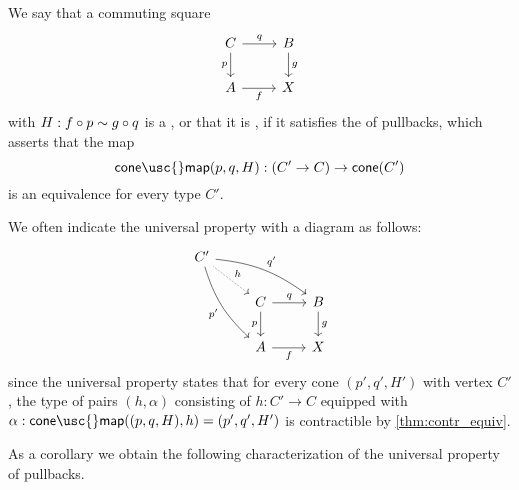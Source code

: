 \begin{defn}
We say that a commuting square
\begin{equation*}
\begin{tikzcd}
C \arrow[r,"q"] \arrow[d,swap,"p"] & B \arrow[d,"g"] \\
A \arrow[r,swap,"f"] & X
\end{tikzcd}
\end{equation*}
with $H:f\circ p\sim g\circ q$ is a , or that it is , if it satisfies the  of pullbacks, which asserts that the map
\begin{equation*}
\mathsf{cone\usc{}map}(p,q,H):(C'\to C)\to\mathsf{cone}(C')
\end{equation*}
is an equivalence for every type $C'$. 
\end{defn}

We often indicate the universal property with a diagram as follows:
\begin{equation*}
\begin{tikzcd}
C' \arrow[drr,bend left=15,"{q'}"] \arrow[dr,densely dotted,"h"] \arrow[ddr,bend right=15,swap,"{p'}"] \\
& C \arrow[r,"q"] \arrow[d,swap,"p"] & B \arrow[d,"g"] \\
& A \arrow[r,swap,"f"] & X
\end{tikzcd}
\end{equation*}
since the universal property states that for every cone $(p',q',H')$ with vertex $C'$, the type of pairs $(h,\alpha)$ consisting of $h:C'\to C$ equipped with $\alpha:\mathsf{cone\usc{}map}((p,q,H),h)=(p',q',H')$ is contractible by \cref{thm:contr_equiv}.

As a corollary we obtain the following characterization of the universal property of pullbacks.

